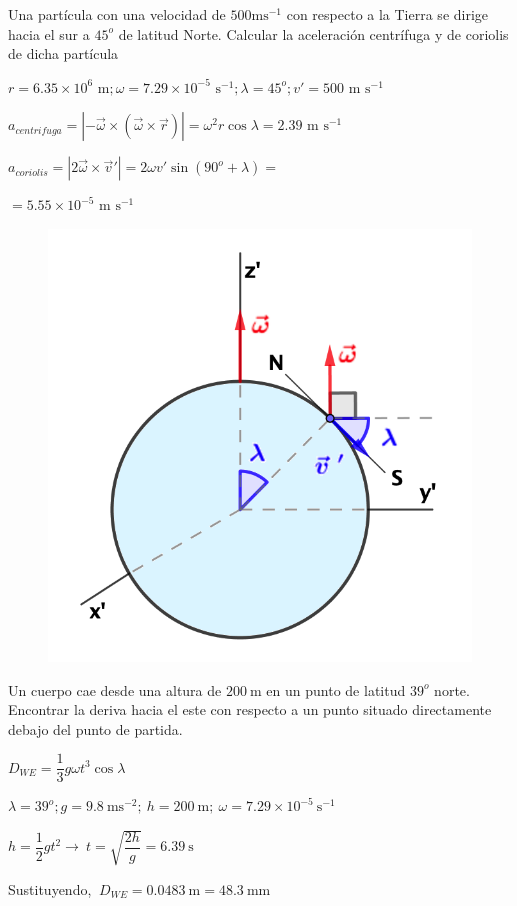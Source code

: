 \begin{prob}
	Una partícula con una velocidad de $500 \mathrm{m s}^{-1}$ con respecto a la Tierra se dirige hacia el sur a $45^o$ de latitud Norte. Calcular la aceleración centrífuga y de coriolis de dicha partícula
\end{prob}
\begin{multicols}{2}
$r=6.35 \times 10^6 \text{ m}; \omega=7.29 \times 10^{-5} \text{ s}^{-1}; \lambda=45^o; v'=500 \text{ m s}^{-1}$

$a_{centrifuga}=|-\vec \omega \times (\vec \omega \times \vec r)|=\omega^2 r \cos \lambda = 2.39 \text{ m s}^{-1}$

$a_{coriolis}=|2\vec \omega \times \vec v '|=2\omega v' \sin(90^o+\lambda)= $

$=5.55 \times 10^{-5} \text{ m s}^{-1}$
\begin{figure}[H]
	\centering
	\includegraphics[width=.3\textwidth]{imagenes/imagenes11/T11IM15.png}
\end{figure}	
\end{multicols}


\begin{prob}
Un cuerpo cae desde una altura de $200\ \mathrm{m}$ en un punto de latitud $39^o$	norte. Encontrar la deriva hacia el este con respecto a un punto situado directamente debajo del punto de partida.
\end{prob}

$D_{WE}=\dfrac 1 3 g \omega t^3 \cos \lambda$

$\lambda=39^o; g=9.8\ \text{ms}^{-2}; \ h=200\ \text{m}; \ \omega=7.29\times 10^{-5}\ \text{s}^{-1}$

$h=\dfrac 1 2 g t^2 \to \ t=\sqrt{\dfrac{2h}g}=6.39\ \text{s}$

Sustituyendo, $\ D_{WE}=0.0483\ \text{m}=48.3\ \text{mm}$

